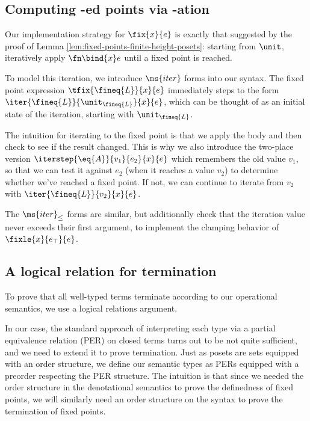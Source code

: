 
\subsection{Computing -ed points via -ation}

Our implementation strategy for $\fix{x}{e}$ is exactly that suggested by the
proof of Lemma \ref{lem:fixed-points-finite-height-posets}: starting from
$\unit$, iteratively apply $\fn\bind{x} e$ until a fixed point is
reached.

To model this iteration, we introduce $\ms{iter}$ forms into our
syntax.  The fixed point expression $\tfix{\fineq{L}}{x}{e}$
immediately steps to the form
$\iter{\fineq{L}}{\unit_{\fineq{L}}}{x}{e}$, which can be thought of
as an initial state of the iteration, starting with $\unit_{\fineq{L}}$.

The intuition for iterating to the fixed point is that we apply the 
body and then check to see if the result changed. This is why we also 
introduce the two-place version $\iterstep{\eq{A}}{v_1}{e_2}{x}{e}$ 
which remembers the old value $v_1$, so that we can test it against $e_2$ (when it
reaches a value $v_2$) to determine
whether we've reached a fixed point. If not, we can continue to iterate from
$v_2$ with $\iter{\fineq{L}}{v_2}{x}{e}$. 

The $\ms{iter}_\le$ forms are similar, but additionally check that the iteration
value never exceeds their first argument, to implement the clamping behavior of
$\fixle{x}{e_\top}{e}$.


\subsection{A logical relation for termination}

To prove that all well-typed terms terminate according to our operational
semantics, we use a logical relations argument.

In our case, the standard approach of interpreting each type via a
partial equivalence relation (PER) on closed terms turns out to be not
quite sufficient, and we need to extend it to prove termination. Just
as posets are sets equipped with an order structure, we define our
semantic types as PERs equipped with a preorder respecting the
PER structure. The intuition is that since we needed the order
structure in the denotational semantics to prove the definedness of
fixed points, we will similarly need an order structure on the syntax
to prove the termination of fixed points.

